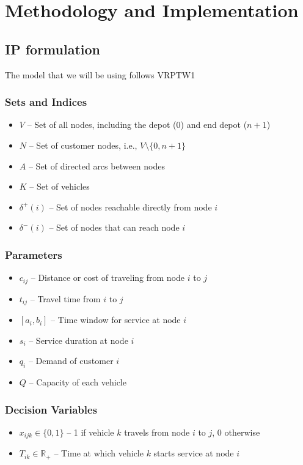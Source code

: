 \documentclass[twocolumn, 10pt]{article}
\begin{document}
\section*{Methodology and Implementation}
\subsection*{IP formulation}

The model that we will be using follows VRPTW1 \cite{toth_vigo_vrp} 
\subsubsection*{Sets and Indices}
\begin{itemize}
    \item $V$ – Set of all nodes, including the depot ($0$) and end depot ($n+1$)
    \item $N$ – Set of customer nodes, i.e., $V \setminus \{0, n+1\}$
    \item $A$ – Set of directed arcs between nodes
    \item $K$ – Set of vehicles
    \item $\delta^+(i)$ – Set of nodes reachable directly from node $i$
    \item $\delta^-(i)$ – Set of nodes that can reach node $i$
\end{itemize}

\subsubsection*{Parameters}
\begin{itemize}
    \item $c_{ij}$ – Distance or cost of traveling from node $i$ to $j$
    \item $t_{ij}$ – Travel time from $i$ to $j$
    \item $[a_i, b_i]$ – Time window for service at node $i$
    \item $s_i$ – Service duration at node $i$
    \item $q_i$ – Demand of customer $i$
    \item $Q$ – Capacity of each vehicle
\end{itemize}

\subsubsection*{Decision Variables}
\begin{itemize}
    \item $x_{ijk} \in \{0, 1\}$ – 1 if vehicle $k$ travels from node $i$ to $j$, 0 otherwise
    \item $T_{ik} \in \mathbb{R}_+$ – Time at which vehicle $k$ starts service at node $i$
\end{itemize}
\end{document}
